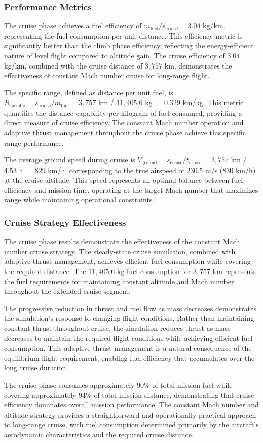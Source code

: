 \subsubsection{Performance Metrics}

The cruise phase achieves a fuel efficiency of $m_{\text{fuel}}/s_{\text{cruise}} = 3.04$ kg/km, representing the fuel consumption per unit distance. This efficiency metric is significantly better than the climb phase efficiency, reflecting the energy-efficient nature of level flight compared to altitude gain. The cruise efficiency of $3.04$ kg/km, combined with the cruise distance of $3,757$ km, demonstrates the effectiveness of constant Mach number cruise for long-range flight.

The specific range, defined as distance per unit fuel, is $R_{\text{specific}} = s_{\text{cruise}} / m_{\text{fuel}} = 3,757$ km / $11,405.6$ kg $= 0.329$ km/kg. This metric quantifies the distance capability per kilogram of fuel consumed, providing a direct measure of cruise efficiency. The constant Mach number operation and adaptive thrust management throughout the cruise phase achieve this specific range performance.

The average ground speed during cruise is $V_{\text{ground}} = s_{\text{cruise}} / t_{\text{cruise}} = 3,757$ km / $4.53$ h $= 829$ km/h, corresponding to the true airspeed of $230.5$ m/s ($830$ km/h) at the cruise altitude. This speed represents an optimal balance between fuel efficiency and mission time, operating at the target Mach number that maximizes range while maintaining operational constraints.

\subsubsection{Cruise Strategy Effectiveness}

The cruise phase results demonstrate the effectiveness of the constant Mach number cruise strategy. The steady-state cruise simulation, combined with adaptive thrust management, achieves efficient fuel consumption while covering the required distance. The $11,405.6$ kg fuel consumption for $3,757$ km represents the fuel requirements for maintaining constant altitude and Mach number throughout the extended cruise segment.

The progressive reduction in thrust and fuel flow as mass decreases demonstrates the simulation's response to changing flight conditions. Rather than maintaining constant thrust throughout cruise, the simulation reduces thrust as mass decreases to maintain the required flight conditions while achieving efficient fuel consumption. This adaptive thrust management is a natural consequence of the equilibrium flight requirement, enabling fuel efficiency that accumulates over the long cruise duration.

The cruise phase consumes approximately $90\%$ of total mission fuel while covering approximately $94\%$ of total mission distance, demonstrating that cruise efficiency dominates overall mission performance. The constant Mach number and altitude strategy provides a straightforward and operationally practical approach to long-range cruise, with fuel consumption determined primarily by the aircraft's aerodynamic characteristics and the required cruise distance.
